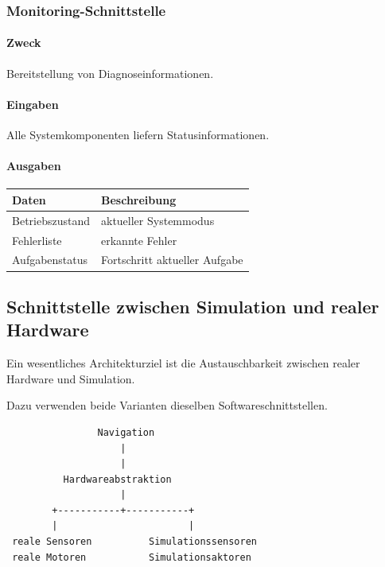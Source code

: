 \subsubsection{Monitoring-Schnittstelle}\label{monitoring-schnittstelle}

\paragraph{Zweck}\label{zweck-10}

Bereitstellung von Diagnoseinformationen.

\paragraph{Eingaben}\label{eingaben-4}

Alle Systemkomponenten liefern Statusinformationen.

\paragraph{Ausgaben}\label{ausgaben-4}

\begin{longtable}[]{@{}ll@{}}
\toprule\noalign{}
Daten & Beschreibung \\
\midrule\noalign{}
\endhead
\bottomrule\noalign{}
\endlastfoot
Betriebszustand & aktueller Systemmodus \\
Fehlerliste & erkannte Fehler \\
Aufgabenstatus & Fortschritt aktueller Aufgabe \\
\end{longtable}

\subsection{Schnittstelle zwischen Simulation und realer
Hardware}\label{schnittstelle-zwischen-simulation-und-realer-hardware}

Ein wesentliches Architekturziel ist die Austauschbarkeit zwischen
realer Hardware und Simulation.

Dazu verwenden beide Varianten dieselben Softwareschnittstellen.

\begin{verbatim}
                Navigation
                    |
                    |
          Hardwareabstraktion
                    |
        +-----------+-----------+
        |                       |
 reale Sensoren          Simulationssensoren
 reale Motoren           Simulationsaktoren
\end{verbatim}

